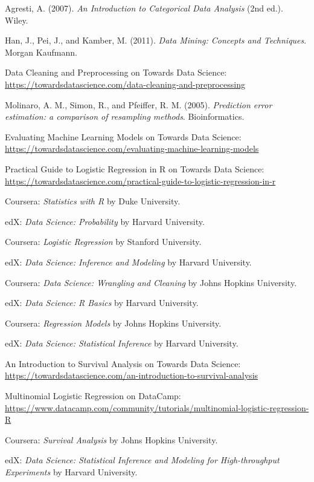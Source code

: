 \begin{thebibliography}{99}
Agresti, A. (2007). \textit{An Introduction to Categorical Data Analysis} (2nd ed.). Wiley.

Han, J., Pei, J., and Kamber, M. (2011). \textit{Data Mining: Concepts and Techniques}. Morgan Kaufmann.

Data Cleaning and Preprocessing on Towards Data Science: \url{https://towardsdatascience.com/data-cleaning-and-preprocessing}

Molinaro, A. M., Simon, R., and Pfeiffer, R. M. (2005). \textit{Prediction error estimation: a comparison of resampling methods}. Bioinformatics.

Evaluating Machine Learning Models on Towards Data Science: \url{https://towardsdatascience.com/evaluating-machine-learning-models}

Practical Guide to Logistic Regression in R on Towards Data Science: \url{https://towardsdatascience.com/practical-guide-to-logistic-regression-in-r}

Coursera: \textit{Statistics with R} by Duke University.

edX: \textit{Data Science: Probability} by Harvard University.

Coursera: \textit{Logistic Regression} by Stanford University.

edX: \textit{Data Science: Inference and Modeling} by Harvard University.

Coursera: \textit{Data Science: Wrangling and Cleaning} by Johns Hopkins University.

edX: \textit{Data Science: R Basics} by Harvard University.

Coursera: \textit{Regression Models} by Johns Hopkins University.

edX: \textit{Data Science: Statistical Inference} by Harvard University.

An Introduction to Survival Analysis on Towards Data Science: \url{https://towardsdatascience.com/an-introduction-to-survival-analysis}

Multinomial Logistic Regression on DataCamp: \url{https://www.datacamp.com/community/tutorials/multinomial-logistic-regression-R}

Coursera: \textit{Survival Analysis} by Johns Hopkins University.

edX: \textit{Data Science: Statistical Inference and Modeling for High-throughput Experiments} by Harvard University.

\end{thebibliography}

